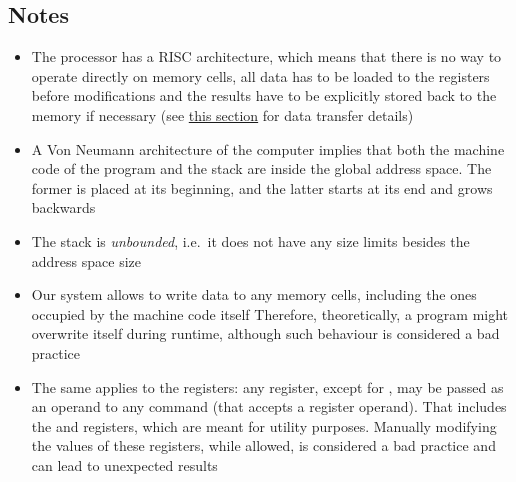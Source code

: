 \subsection{Notes}

\begin{itemize}
    \item The  processor has a RISC architecture,
    which means that there is no way to operate directly on memory cells,
    all data has to be loaded to the registers before modifications and
    the results have to be explicitly stored back to the memory if necessary
    (see \hyperlink{cmd:memory}{this section} for data transfer details)

    \item A Von Neumann architecture of the  computer implies that
    both the machine code of the program and the stack are inside the
    global address space.
    The former is placed at its beginning, and the latter starts at its end
    and grows backwards

    \item The stack is \textit{unbounded}, i.e.\ it does not have any size
    limits besides the address space size

    \item Our system allows to write data to any memory cells, including
    the ones occupied by the machine code itself
    Therefore, theoretically, a program might overwrite itself during runtime,
    although such behaviour is considered a bad practice

    \item The same applies to the registers: any register, except for
    , may be passed as an operand to any command
    (that accepts a register operand).
    That includes the  and  registers, which are meant
    for utility purposes.
    Manually modifying the values of these registers, while allowed,
    is considered a bad practice and can lead to unexpected results
\end{itemize}
